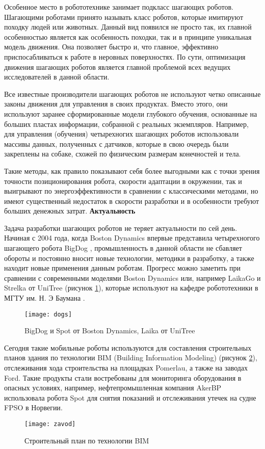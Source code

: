 Особенное место в робототехнике занимает подкласс шагающих роботов. Шагающими роботами принято называть класс роботов, которые имитируют походку людей или животных. Данный вид появился не просто так, их главной особенностью является как особенность походки, так и в принципе уникальная модель движения. Она позволяет быстро и, что главное, эффективно приспосабливаться к работе в неровных поверхностях\cite{movement_art}. По сути, оптимизация движения шагающих роботов является главной проблемой всех ведущих исследователей в данной области. 

Все известные производители шагающих роботов не используют четко описанные законы движения для управления в своих продуктах. Вместо этого, они используют заранее сформированные модели глубокого обучения, основанные на больших пластах информации, собранной с реальных экземпляров. Например, для управления (обучения) четырехногих шагающих роботов использовали массивы данных, полученных с датчиков, которые в свою очередь были закреплены на собаке, схожей по физическим размерам конечностей и тела\cite{dog_and_robo_dog}. 

Такие методы, как правило показывают себя более выгодными как с точки зрения точности позиционирования робота, скорости адаптации в окружении, так и выигрывают по энергоэффективности в сравнении с классическими методами, но имеют существенный недостаток в скорости разработки и в особенности требуют больших денежных затрат. 
\newpage
\textbf{Актуальность}


Задача разработки шагающих роботов не теряет актуальности по сей день. Начиная с 2004 года, когда Boston Dynamics впервые представила четырехногого шагающего робота BigDog \cite{BigDog}, промышленность в данной области не сбавляет обороты и постоянно вносит новые технологии, методики в разработку, а также находит новые применения данным роботам. Прогресс можно заметить при сравнении с современными моделями Boston Dynamics или, например LaikaGo и Strelka от UniTree\cite{Laika}  (рисунок \ref{dogs}), которые используют на кафедре робототехники в МГТУ им. Н. Э Баумана \cite{Bomonka}.
\begin{figure}[h]
	\begin{center}
		\texttt{[image: dogs]}
		\caption{BigDog и Spot от Boston Dynamics, Laika от UniTree}
		\label{dogs}
	\end{center}
\end{figure}

Сегодня такие мобильные роботы используются для составления строительных планов здания по технологии BIM (Building Information Modeling) (рисунок \ref{zavod}), отслеживания хода строительства на площадках Pomerlau, а также на заводах Ford. Такие продукты стали востребованы для мониторинга оборудования в опасных условиях, например, нефтепромышленная компания AkerBP использовала робота Spot для снятия показаний и отслеживания утечек на судне FPSO в Норвегии\cite{fpso1,fpso2}.

\newpage
\begin{figure}[h]
	\begin{center}
		\texttt{[image: zavod]}
		\caption{Строительный план по технологии BIM}
		\label{zavod}
	\end{center}
\end{figure}
